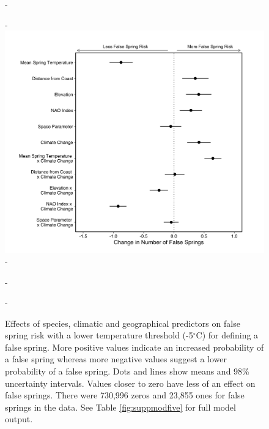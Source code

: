 \documentclass{article}\usepackage[]{graphicx}\usepackage[]{color}
\begin{document}
{\begin{figure} [H]
  -\begin{center}
  -\includegraphics[width=12cm]{..//analyses/figures/model_output_98_five.png}
  -\caption{Effects of species, climatic and geographical predictors on false spring risk with a lower temperature threshold (-5$^{\circ}$C) for defining a false spring. More positive values indicate an increased probability of a false spring whereas more negative values suggest a lower probability of a false spring. Dots and lines show means and 98\% uncertainty intervals. Values closer to zero have less of an effect on false springs. There were 730,996 zeros and 23,855 ones for false springs in the data. See Table \ref{fig:suppmodfive} for full model output. }\label{fig:five}
  -\end{center}
  -\end{figure}}
 
\end{document}
